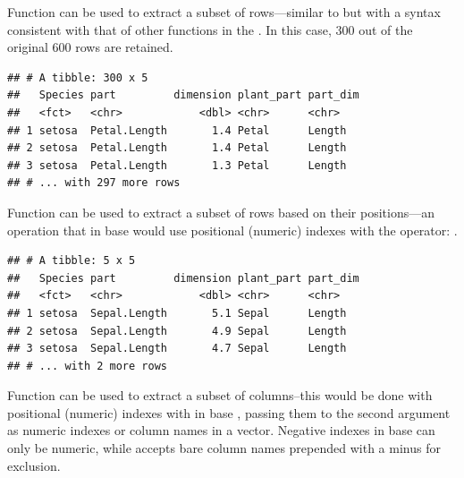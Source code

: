 \documentclass[krantz2]{krantz}\usepackage{knitr}
\begin{document}
Function  can be used to extract a subset of rows---similar to  but with a syntax consistent with that of other functions in the . In this case, 300 out of the original 600 rows are retained.

\begin{knitrout}\footnotesize
{}\color{fgcolor}\begin{kframe}
\begin{alltt}
 \hlopt{==} \hlstd{)}
\end{alltt}
\begin{verbatim}
## # A tibble: 300 x 5
##   Species part         dimension plant_part part_dim
##   <fct>   <chr>            <dbl> <chr>      <chr>
## 1 setosa  Petal.Length       1.4 Petal      Length
## 2 setosa  Petal.Length       1.4 Petal      Length
## 3 setosa  Petal.Length       1.3 Petal      Length
## # ... with 297 more rows
\end{verbatim}
\end{kframe}
\end{knitrout}

Function  can be used to extract a subset of rows based on their positions---an operation that in base \Rlang would use positional (numeric) indexes with the \code{[ , ]} operator: .

\begin{knitrout}\footnotesize
{}\color{fgcolor}\begin{kframe}
\begin{alltt}
 \hlopt{:}\hlstd{)}
\end{alltt}
\begin{verbatim}
## # A tibble: 5 x 5
##   Species part         dimension plant_part part_dim
##   <fct>   <chr>            <dbl> <chr>      <chr>
## 1 setosa  Sepal.Length       5.1 Sepal      Length
## 2 setosa  Sepal.Length       4.9 Sepal      Length
## 3 setosa  Sepal.Length       4.7 Sepal      Length
## # ... with 2 more rows
\end{verbatim}
\end{kframe}
\end{knitrout}

Function  can be used to extract a subset of columns--this would be done with positional (numeric) indexes with \code{[ , ]} in base \Rlang, passing them to the second argument as numeric indexes or column names in a vector. Negative indexes in base \Rlang can only be numeric, while  accepts bare column names prepended with a minus for exclusion.
\end{document}
